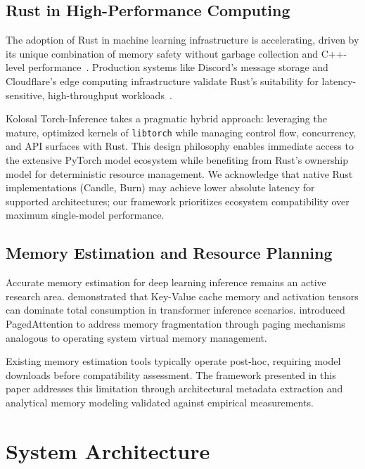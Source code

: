\documentclass[10pt,twocolumn,a4paper]{article}
\theoremstyle{definition}
\theoremstyle{plain}
\begin{document}
\subsection{Rust in High-Performance Computing}

The adoption of Rust in machine learning infrastructure is accelerating, driven by its unique combination of memory safety without garbage collection and C++-level performance~\citep{rustbook}. Production systems like Discord's message storage and Cloudflare's edge computing infrastructure validate Rust's suitability for latency-sensitive, high-throughput workloads~\citep{discord2020rust,cloudflare2022rust}.

Kolosal Torch-Inference takes a pragmatic hybrid approach: leveraging the mature, optimized kernels of \texttt{libtorch} while managing control flow, concurrency, and API surfaces with Rust. This design philosophy enables immediate access to the extensive PyTorch model ecosystem while benefiting from Rust's ownership model for deterministic resource management. We acknowledge that native Rust implementations (Candle, Burn) may achieve lower absolute latency for supported architectures; our framework prioritizes ecosystem compatibility over maximum single-model performance.

\subsection{Memory Estimation and Resource Planning}

Accurate memory estimation for deep learning inference remains an active research area. \citet{pope2022efficiently} demonstrated that Key-Value cache memory and activation tensors can dominate total consumption in transformer inference scenarios. \citet{kwon2023pagedattention} introduced PagedAttention to address memory fragmentation through paging mechanisms analogous to operating system virtual memory management.

Existing memory estimation tools typically operate post-hoc, requiring model downloads before compatibility assessment. The framework presented in this paper addresses this limitation through architectural metadata extraction and analytical memory modeling validated against empirical measurements.

\section{System Architecture}
\label{sec:architecture}
\end{document}
